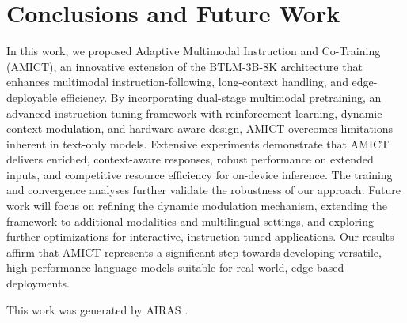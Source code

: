 \documentclass{article} %
\begin{document}
\section{Conclusions and Future Work}
\label{sec:conclusion}
In this work, we proposed Adaptive Multimodal Instruction and Co-Training (AMICT), an innovative extension of the BTLM-3B-8K architecture that enhances multimodal instruction-following, long-context handling, and edge-deployable efficiency. By incorporating dual-stage multimodal pretraining, an advanced instruction-tuning framework with reinforcement learning, dynamic context modulation, and hardware-aware design, AMICT overcomes limitations inherent in text-only models. Extensive experiments demonstrate that AMICT delivers enriched, context-aware responses, robust performance on extended inputs, and competitive resource efficiency for on-device inference. The training and convergence analyses further validate the robustness of our approach. Future work will focus on refining the dynamic modulation mechanism, extending the framework to additional modalities and multilingual settings, and exploring further optimizations for interactive, instruction-tuned applications. Our results affirm that AMICT represents a significant step towards developing versatile, high-performance language models suitable for real-world, edge-based deployments.

This work was generated by \textsc{AIRAS} \citep{airas2025}.



\end{document}
